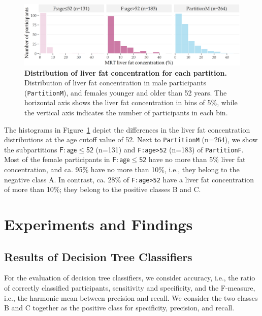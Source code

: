 \documentclass[
  oneside]{book}
\begin{document}
\begin{figure}[htb]

{\centering \includegraphics[width=1\linewidth]{figures/03-histogram-partitions-age-liverfat} 

}

\caption{\textbf{Distribution of liver fat concentration for each partition.} Distribution of liver fat concentration in male participants (\texttt{PartitionM}), and females younger and older than 52 years. The horizontal axis shows the liver fat concentration in bins of 5\%, while the vertical axis indicates the number of participants in each bin.}\label{fig:03-histogram-partitions-age-liverfat}
\end{figure}

The histograms in Figure~\ref{fig:03-histogram-partitions-age-liverfat} depict the differences in the liver fat concentration distributions at the age cutoff value of 52.
Next to \texttt{PartitionM} (n=264), we show the subpartitions \(\mathsf{F:age\leq{}52}\) (n=131) and \texttt{F:age\textgreater{}52} (n=183) of \texttt{PartitionF}.
Most of the female participants in \(\mathsf{F:age\leq{}52}\) have no more than 5\% liver fat concentration, and ca. 95\% have no more than 10\%, i.e., they belong to the negative class A.
In contrast, ca. 28\% of \texttt{F:age\textgreater{}52} have a liver fat concentration of more than 10\%; they belong to the positive classes B and C.

\hypertarget{imm-experiments}{%
\section{Experiments and Findings}\label{imm-experiments}}

\hypertarget{imm-experiments-trees}{%
\subsection{Results of Decision Tree Classifiers}\label{imm-experiments-trees}}

For the evaluation of decision tree classifiers, we consider accuracy, i.e., the ratio of correctly classified participants, sensitivity and specificity, and the F-measure, i.e., the harmonic mean between precision and recall.
We consider the two classes B and C together as the positive class for specificity, precision, and recall.
\end{document}
